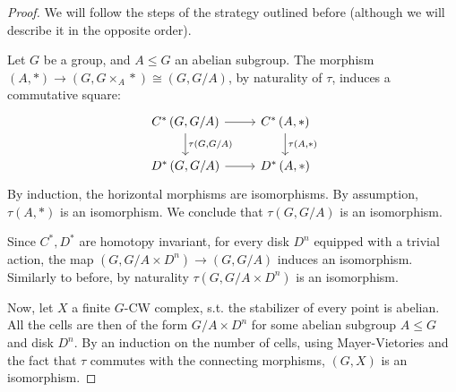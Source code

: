 \begin{proof}
	We will follow the steps of the strategy outlined before (although we will describe it in the opposite order).
	
	Let $G$ be a group, and $A \leq G$ an abelian subgroup.
	The morphism $\left(A, *\right) \to \left(G, G \times_A *\right) \cong \left(G, G/A\right)$, by naturality of $\tau$, induces a commutative square:
	$$
	\begin{tikzcd}
		C^*\left(G, G/A\right) \arrow{r}{} \arrow{d}{\tau\left(G, G/A\right)} & C^*\left(A, *\right) \arrow{d}{\tau\left(A, *\right)} \\
		D^*\left(G, G/A\right) \arrow{r}{} & D^*\left(A, *\right)
	\end{tikzcd}
	$$
	By induction, the horizontal morphisms are isomorphisms.
	By assumption, $\tau\left(A, *\right)$ is an isomorphism.
	We conclude that $\tau\left(G, G/A\right)$ is an isomorphism.
	
	Since $C^*, D^*$ are homotopy invariant, for every disk $D^n$ equipped with a trivial action, the map $\left(G, G/A \times D^n\right) \to \left(G, G/A\right)$ induces an isomorphism.
	Similarly to before, by naturality $\tau\left(G, G/A \times D^n\right)$ is an isomorphism.
	
	Now, let $X$ a finite $G$-CW complex, s.t. the stabilizer of every point is abelian.
	All the cells are then of the form $G/A \times D^n$ for some abelian subgroup $A \leq G$ and disk $D^n$.
	By an induction on the number of cells, using Mayer-Vietories and the fact that $\tau$ commutes with the connecting morphisms, $\left(G, X\right)$ is an isomorphism.
	

\end{proof}
